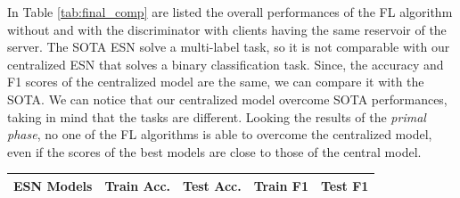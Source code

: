 {{{In Table \ref{tab:final_comp} are listed the overall performances of the FL algorithm without and with the discriminator with clients having the same reservoir of the server. The SOTA ESN \cite{bacciu2021federated} solve a multi-label task, so it is not comparable with our centralized ESN that solves a binary classification task. Since, the accuracy and F1 scores of the centralized model are the same, we can compare it with the SOTA. We can notice that our centralized model overcome SOTA performances, taking in mind that the tasks are different. Looking the results of the \textit{primal phase}, no one of the FL algorithms is able to overcome the centralized model, even if the scores of the best models are close to those of the central model.

{\renewcommand{\arraystretch}{1.0}
\begin{table}[H]
    \centering
    \begin{tabular}{|l|c|c|c|c|}
        \hline
        ESN Models & Train Acc. & Test Acc. & Train F1 & Test F1 \\ \hline\hline
        

\end{tabular}
\end{table}}}}}
